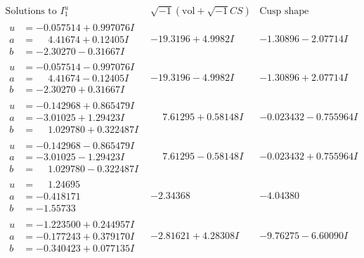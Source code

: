 \documentclass[1p]{elsarticle_modified}
\theoremstyle{definition}
\newcommand{\I}{\sqrt{-1}}
\begin{document}
$$\begin{array}{c|c|c}  
\text{Solutions to }I^u_{1}& \I (\text{vol} + \sqrt{-1}CS) & \text{Cusp shape}\\
 \hline 
\begin{aligned}
u &= -0.057514 + 0.997076 I \\
a &= \phantom{-}4.41674 + 0.12405 I \\
b &= -2.30270 - 0.31667 I\end{aligned}
 & -19.3196 + 4.9982 I & -1.30896 - 2.07714 I \\ \hline\begin{aligned}
u &= -0.057514 - 0.997076 I \\
a &= \phantom{-}4.41674 - 0.12405 I \\
b &= -2.30270 + 0.31667 I\end{aligned}
 & -19.3196 - 4.9982 I & -1.30896 + 2.07714 I \\ \hline\begin{aligned}
u &= -0.142968 + 0.865479 I \\
a &= -3.01025 + 1.29423 I \\
b &= \phantom{-}1.029780 + 0.322487 I\end{aligned}
 & \phantom{-}7.61295 + 0.58148 I & -0.023432 - 0.755964 I \\ \hline\begin{aligned}
u &= -0.142968 - 0.865479 I \\
a &= -3.01025 - 1.29423 I \\
b &= \phantom{-}1.029780 - 0.322487 I\end{aligned}
 & \phantom{-}7.61295 - 0.58148 I & -0.023432 + 0.755964 I \\ \hline\begin{aligned}
u &= \phantom{-}1.24695\phantom{ +0.000000I} \\
a &= -0.418171\phantom{ +0.000000I} \\
b &= -1.55733\phantom{ +0.000000I}\end{aligned}
 & -2.34368\phantom{ +0.000000I} & -4.04380\phantom{ +0.000000I} \\ \hline\begin{aligned}
u &= -1.223500 + 0.244957 I \\
a &= -0.177243 + 0.379170 I \\
b &= -0.340423 + 0.077135 I\end{aligned}
 & -2.81621 + 4.28308 I & -9.76275 - 6.60090 I \\ \hline\begin{aligned}

\end{aligned}
\end{array}$$
\end{document}
